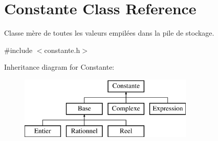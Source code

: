 \hypertarget{class_constante}{\section{Constante Class Reference}
\label{class_constante}
}


Classe mère de toutes les valeurs empilées dans la pile de stockage.  




{\ttfamily \#include $<$constante.\-h$>$}

Inheritance diagram for Constante\-:\begin{figure}[H]
\begin{center}
\leavevmode
\includegraphics[height=3.000000cm]{class_constante}
\end{center}
\end{figure}
